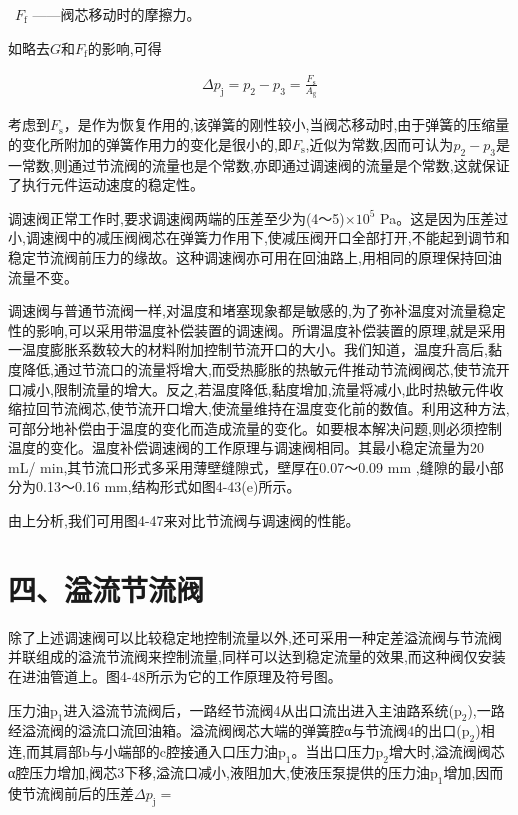 \ $F_\text{f}$ ——阀芯移动时的摩擦力。

如略去$G$和$F_\text{f}$的影响,可得

\begin{equation}
\begin{split}
\Delta p_\text{j} = p_2 - p_3 = \frac{F_\text{s}}{A_\text{g}}
\end{split}
\end{equation}

考虑到$F_\text{s}$，是作为恢复作用的,该弹簧的刚性较小,当阀芯移动时,由于弹簧的压缩量的变化所附加的弹簧作用力的变化是很小的,即$F_\text{s}$,近似为常数,因而可认为$p_2-p_3$是一常数,则通过节流阀的流量也是个常数,亦即通过调速阀的流量是个常数,这就保证了执行元件运动速度的稳定性。

调速阀正常工作时,要求调速阀两端的压差至少为(4～5)$\times 10^5$ Pa。这是因为压差过小,调速阀中的减压阀阀芯在弹簧力作用下,使减压阀开口全部打开,不能起到调节和稳定节流阀前压力的缘故。这种调速阀亦可用在回油路上,用相同的原理保持回油流量不变。

调速阀与普通节流阀一样,对温度和堵塞现象都是敏感的,为了弥补温度对流量稳定性的影响,可以采用带温度补偿装置的调速阀。所谓温度补偿装置的原理,就是采用一温度膨胀系数较大的材料附加控制节流开口的大小。我们知道，温度升高后,黏度降低,通过节流口的流量将增大,而受热膨胀的热敏元件推动节流阀阀芯,使节流开口减小,限制流量的增大。反之,若温度降低,黏度增加,流量将减小,此时热敏元件收缩拉回节流阀芯,使节流开口增大,使流量维持在温度变化前的数值。利用这种方法,可部分地补偿由于温度的变化而造成流量的变化。如要根本解决问题,则必须控制温度的变化。温度补偿调速阀的工作原理与调速阀相同。其最小稳定流量为20 mL/ min,其节流口形式多采用薄壁缝隙式，壁厚在0.07～0.09 mm ,缝隙的最小部分为0.13～0.16 mm,结构形式如图4-43(e)所示。

由上分析,我们可用图4-47来对比节流阀与调速阀的性能。

\section*{四、溢流节流阀}

除了上述调速阀可以比较稳定地控制流量以外,还可采用一种定差溢流阀与节流阀并联组成的溢流节流阀来控制流量,同样可以达到稳定流量的效果,而这种阀仅安装在进油管道上。图4-48所示为它的工作原理及符号图。

压力油$\text{p}_1$进入溢流节流阀后，一路经节流阀4从出口流出进入主油路系统($\text{p}_2$),一路经溢流阀的溢流口流回油箱。溢流阀阀芯大端的弹簧腔α与节流阀4的出口($\text{p}_2$)相连,而其肩部b与小端部的c腔接通入口压力油$\text{p}_1$。当出口压力$\text{p}_2$增大时,溢流阀阀芯α腔压力增加,阀芯3下移,溢流口减小,液阻加大,使液压泵提供的压力油$\text{p}_1$增加,因而使节流阀前后的压差$\Delta p_\text{j} = $
